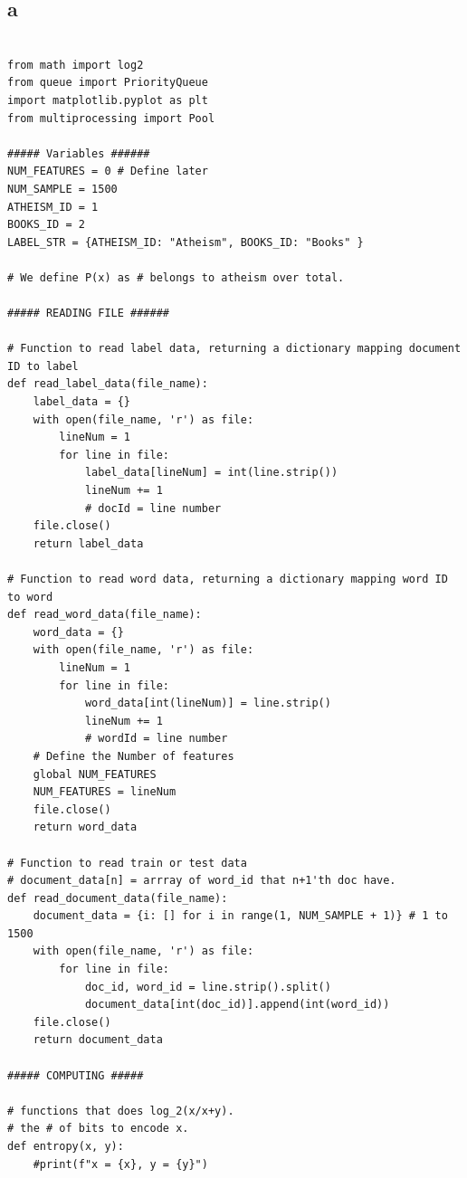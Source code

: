 \documentclass[10pt]{article}
\begin{document}
\subsection{} 
\begin{enumerate}
\part{a} 

\begin{lstlisting}

from math import log2
from queue import PriorityQueue
import matplotlib.pyplot as plt
from multiprocessing import Pool

##### Variables ######
NUM_FEATURES = 0 # Define later
NUM_SAMPLE = 1500
ATHEISM_ID = 1
BOOKS_ID = 2
LABEL_STR = {ATHEISM_ID: "Atheism", BOOKS_ID: "Books" }

# We define P(x) as # belongs to atheism over total.

##### READING FILE ######

# Function to read label data, returning a dictionary mapping document ID to label
def read_label_data(file_name):
    label_data = {}
    with open(file_name, 'r') as file:
        lineNum = 1
        for line in file:
            label_data[lineNum] = int(line.strip())
            lineNum += 1
            # docId = line number
    file.close()
    return label_data

# Function to read word data, returning a dictionary mapping word ID to word
def read_word_data(file_name):
    word_data = {}
    with open(file_name, 'r') as file:
        lineNum = 1
        for line in file:
            word_data[int(lineNum)] = line.strip()
            lineNum += 1
            # wordId = line number
    # Define the Number of features
    global NUM_FEATURES
    NUM_FEATURES = lineNum
    file.close()
    return word_data

# Function to read train or test data
# document_data[n] = arrray of word_id that n+1'th doc have.
def read_document_data(file_name):
    document_data = {i: [] for i in range(1, NUM_SAMPLE + 1)} # 1 to 1500 
    with open(file_name, 'r') as file:
        for line in file:
            doc_id, word_id = line.strip().split()
            document_data[int(doc_id)].append(int(word_id))
    file.close()
    return document_data

##### COMPUTING #####

# functions that does log_2(x/x+y).
# the # of bits to encode x.
def entropy(x, y):
    #print(f"x = {x}, y = {y}")
    

\end{lstlisting}
\end{enumerate}
\end{document}
